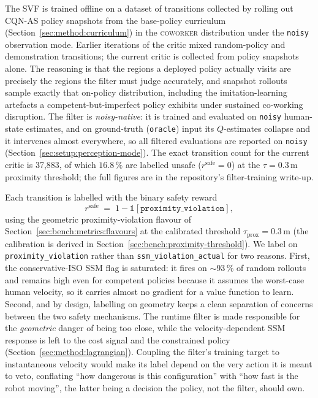 \documentclass[11pt,a4paper]{report}
\newcommand{\ssm}{SSM}
\newcommand{\cqnas}{CQN-AS}
\newcommand{\coworker}{\textsc{coworker}}
\begin{document}
The SVF is trained offline on a dataset of transitions collected by
rolling out \cqnas{} policy snapshots from the base-policy curriculum
(Section~\ref{sec:method:curriculum}) in the \coworker{} distribution
under the \texttt{noisy} observation mode. Earlier iterations of the
critic mixed random-policy and demonstration transitions; the current
critic is collected from policy snapshots alone. The reasoning is that
the regions a deployed policy actually visits are precisely the regions
the filter must judge accurately, and snapshot rollouts sample exactly
that on-policy distribution, including the imitation-learning artefacts
a competent-but-imperfect policy exhibits under sustained co-working
disruption. The filter is \emph{noisy-native}: it is trained and
evaluated on \texttt{noisy} human-state estimates, and on
ground-truth (\texttt{oracle}) input its $Q$-estimates collapse and it
intervenes almost everywhere, so all filtered evaluations are reported
on \texttt{noisy} (Section~\ref{sec:setup:perception-mode}). The exact
transition count for the current critic is 37{,}883, of which
$16.8\,\%$ are labelled unsafe ($r^{\mathrm{safe}} = 0$) at the
$\tau = 0.3$\,m proximity threshold; the full figures are in the
repository's filter-training write-up.

Each transition is labelled with the binary safety reward
\begin{equation}
  r^{\mathrm{safe}} \;=\; 1 - \mathbb{1}[\texttt{proximity\_violation}],
  \label{eq:r-safe}
\end{equation}
using the geometric proximity-violation flavour of
Section~\ref{sec:bench:metrics:flavours} at the calibrated threshold
$\tau_{\mathrm{prox}} = 0.3$\,m (the calibration is derived in
Section~\ref{sec:bench:proximity-threshold}). We label on
\texttt{proximity\_violation} rather than \texttt{ssm\_violation\_actual}
for two reasons. First, the conservative-ISO \ssm{} flag is saturated:
it fires on $\sim$93\,\% of random rollouts and remains high even for
competent policies because it assumes the worst-case human velocity, so
it carries almost no gradient for a value function to learn. Second, and
by design, labelling on geometry keeps a clean separation of concerns
between the two safety mechanisms. The runtime filter is made
responsible for the \emph{geometric} danger of being too close, while
the velocity-dependent \ssm{} response is left to the cost signal and
the constrained policy (Section~\ref{sec:method:lagrangian}). Coupling
the filter's training target to instantaneous velocity would make its
label depend on the very action it is meant to veto, conflating ``how
dangerous is this configuration'' with ``how fast is the robot moving'',
the latter being a decision the policy, not the filter, should own.
\end{document}

